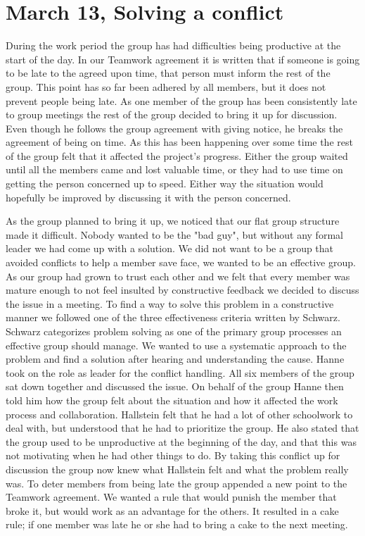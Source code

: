 \section{March 13, Solving a conflict}

During the work period the group has had difficulties being productive at the start of the day. In our Teamwork agreement it is written that if someone is going to be late to the agreed upon time, that person must inform the rest of the group. This point has so far been adhered by all members, but it does not prevent people being late. As one member of the group has been consistently  late to group meetings the rest of the group decided to bring it up for discussion. Even though he follows the group agreement with giving notice, he breaks the agreement of being on time. As this has been happening over some time the rest of the group felt that it affected the project's progress. Either the group waited until all the members came and lost valuable time, or they had to use time on getting the person concerned up to speed. Either way the situation would hopefully be improved by discussing it with the person concerned.

As the group planned to bring it up, we noticed that our flat group structure made it difficult. Nobody wanted to be the "bad guy", but without any formal leader we had come up with a solution. We did not want to be a group that avoided conflicts to help a member save face, we wanted to be an effective group. As our group had grown to trust each other and we felt that every member was mature enough to not feel insulted by constructive feedback we decided to discuss the issue in a meeting. To find a way to solve this problem in a constructive manner we followed one of the three effectiveness criteria written by Schwarz\cite{WorkGroups}. Schwarz categorizes problem solving as one of the primary group processes an effective group should manage. We wanted to use a systematic approach to the problem and find a solution after hearing and understanding the cause. Hanne took on the role as leader for the conflict handling. All six members of the group sat down together and discussed the issue. On behalf of the group Hanne then told him how the group felt about the situation and how it affected the work process and collaboration. Hallstein felt that he had a lot of other schoolwork to deal with, but understood that he had to prioritize the group. He also stated that the group used to be unproductive at the beginning of the day, and that this was not motivating when he had other things to do. By taking this conflict up for discussion the group now knew what Hallstein felt and what the problem really was. To deter members from being late the group appended a new point to the Teamwork agreement. We wanted a rule that would punish the member that broke it, but would work as an advantage for the others. It resulted in a cake rule; if one member was late he or she had to bring a cake to the next meeting. 

